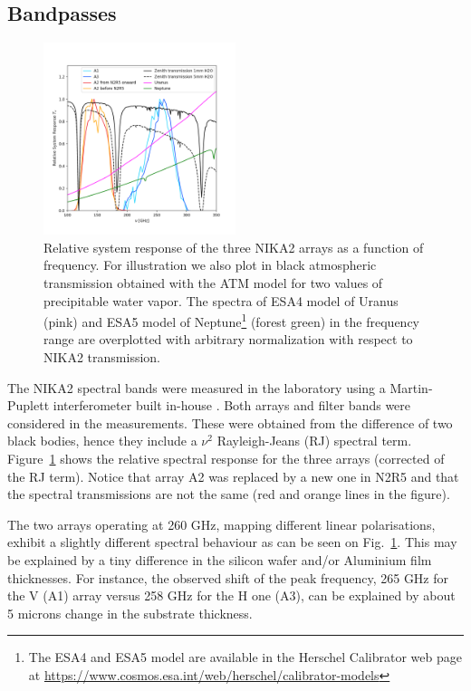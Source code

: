\subsection{Bandpasses}

\begin{figure}[ht!] %
\begin{center}
\includegraphics[clip,trim={0, 1cm, 0, 2cm},width=0.5\textwidth]{Figures/bandpasses_nika2_colorsok.png}
\caption[NIKA2 transmission]{Relative system response of the three NIKA2 arrays as a
  function of frequency. For illustration we also plot in black
  atmospheric transmission obtained with the ATM model \citep{ATM,
    Pardo2002} for two values of precipitable water vapor. The spectra
  of ESA4 model of Uranus (pink) and ESA5 model of
  Neptune\footnote{The ESA4 and ESA5 model are available in the Herschel
    Calibrator web page at \url{https://www.cosmos.esa.int/web/herschel/calibrator-models}} (forest green) in the frequency range are overplotted with arbitrary normalization with respect to NIKA2 transmission.} 
 \label{spectralband1}
\end{center}
\end{figure}

The NIKA2 spectral bands were measured in the laboratory using a
Martin-Puplett interferometer built in-house \cite{durand}.  Both
arrays and filter bands were considered in the measurements. These
were obtained from the difference of two black bodies, hence they
include a $\nu^2$ Rayleigh-Jeans (RJ) spectral term.
Figure~\ref{spectralband1} shows the relative spectral response for
the three arrays (corrected of the RJ term).  Notice that array A2 was
replaced by a new one in N2R5 and that the spectral transmissions are
not the same (red and orange lines in the figure).

The two arrays operating at 260 GHz, mapping different linear polarisations,
exhibit a slightly different spectral behaviour as can be
seen on Fig.~\ref{spectralband1}. This may be explained by a tiny
difference in the silicon wafer and/or Aluminium film thicknesses. For
instance, the observed shift of the peak frequency, 265 GHz for the V
(A1) array versus 258 GHz for the H one (A3), can be explained by
about 5 microns change in the substrate thickness. 

